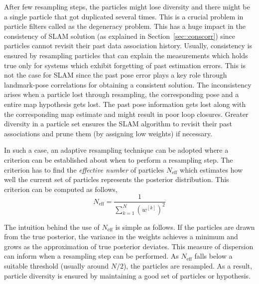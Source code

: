 After few resampling steps, the particles might lose diversity and there might be a single particle that got duplicated several times. This is a crucial problem in particle filters called as the degeneracy problem. This has a huge impact in the consistency of SLAM solution (as explained in Section~\ref{sec::conscorr}) since particles cannot revisit their past data association history. Usually, consistency is ensured by resampling particles that can explain the measurements which holds true only for systems which exhibit forgetting of past estimation errors. This is not the case for SLAM since the past pose error plays a key role through landmark-pose correlations for obtaining a consistent solution. The inconsistency arises when a particle lost through resampling, the corresponding pose and a entire map hypothesis gets lost. The past pose information gets lost along with the corresponding map estimate and might result in poor loop closures. Greater diversity in a particle set ensures the SLAM algorithm to revisit their past associations and prune them (by assigning low weights) if necessary.

In such a case, an adaptive resampling technique \cite{grisetti2005improving} can be adopted where a criterion can be established about when to perform a resampling step. The criterion has to find the \textit{effective number} of particles $N_{\text{eff}}$ which estimates how well the current set of particles represents the posterior distribution. This criterion can be computed as follows,
\begin{equation}
N_{\text{eff}}=\frac{\displaystyle 1}{\displaystyle \sum_{k=1}^N\left(w^{[k]}\right)^2}
\end{equation}     

The intuition behind the use of $N_{\text{eff}}$ is simple as follows. If the particles are drawn from the true posterior, the variance in the weights achieves a minimum and grows as the approximation of true posterior deviates. This measure of dispersion can inform when a resampling step can be performed. As $N_{\text{eff}}$ falls below a suitable threshold (usually around $N/2$), the particles are resampled. As a result, particle diversity is ensured by maintaining a good set of particles or hypothesis.

